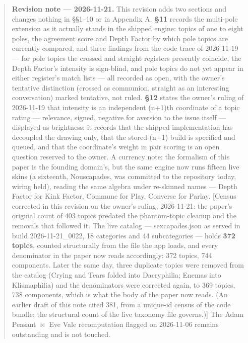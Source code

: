 \begin{quote}
\textbf{Revision note --- 2026-11-21.} This revision adds two sections
and changes nothing in \S \S 1--10 or in Appendix A. \textbf{\S 11} records
the multi-pole extension as it actually stands in the shipped engine:
topics of one to eight poles, the agreement score and Depth Factor by
which pole topics are currently compared, and three findings from the
code trace of 2026-11-19 --- for pole topics the crossed and straight
registers presently coincide, the Depth Factor's intensity is
sign-blind, and pole topics do not yet appear in either register's match
lists --- all recorded as open, with the owner's tentative distinction
(crossed as communion, straight as an interesting conversation) marked
tentative, not ruled. \textbf{\S 12} states the owner's ruling of
2026-11-19 that intensity is an independent (n+1)th coordinate of a
topic rating --- relevance, signed, negative for aversion to the issue
itself --- displayed as brightness; it records that the shipped
implementation has decoupled the drawing only, that the stored-(n+1)
build is specified and queued, and that the coordinate's weight in pair
scoring is an open question reserved to the owner. A currency note: the
formalism of this paper is the founding domain's, but the same engine
now runs fifteen live skins (a sixteenth, Nouscapades, was committed to
the repository today, wiring held), reading the same algebra under
re-skinned names --- Depth Factor for Kink Factor, Commune for Play,
Converse for Parlay. {[}Census corrected in this revision on the owner's
ruling, 2026-11-21: the paper's original count of 403 topics predated
the phantom-topic cleanup and the removals that followed it. The live
catalog --- sexcapades.json as served in build 2026-11-21\_0022, 18
categories and 44 subcategories --- holds \textbf{372 topics}, counted
structurally from the file the app loads, and every denominator in the
paper now reads accordingly: 372 topics, 744 components. Later the same day, three duplicate topics were removed from the catalog (Crying and Tears folded into Dacryphilia; Enemas into Klismaphilia) and the denominators were corrected again, to 369 topics, 738 components, which is what the body of the paper now reads. (An earlier
draft of this note cited 381, from a unique-id census of the code
bundle; the structural count of the live taxonomy file governs.){]} The
Adam Peasant $\bowtie$ Eve Vale recomputation flagged on 2026-11-06 remains
outstanding and is not touched.
\end{quote}

